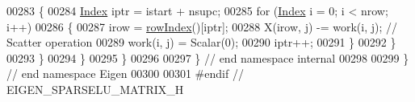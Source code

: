 \begin{DoxyCode}
00283         \{
00284           \hyperlink{namespace_eigen_a62e77e0933482dafde8fe197d9a2cfde}{Index} iptr = istart + nsupc; 
00285           \textcolor{keywordflow}{for} (\hyperlink{namespace_eigen_a62e77e0933482dafde8fe197d9a2cfde}{Index} i = 0; i < nrow; i++)
00286           \{
00287             irow = \hyperlink{group___sparse_l_u___module_a8e6b4f399aa468a10e58db627d43a12a}{rowIndex}()[iptr]; 
00288             X(irow, j) -= work(i, j); \textcolor{comment}{// Scatter operation}
00289             work(i, j) = Scalar(0); 
00290             iptr++;
00291           \}
00292         \}
00293       \}
00294     \} 
00295 \}
00296 
00297 \} \textcolor{comment}{// end namespace internal}
00298 
00299 \} \textcolor{comment}{// end namespace Eigen}
00300 
00301 \textcolor{preprocessor}{#endif // EIGEN\_SPARSELU\_MATRIX\_H}
\end{DoxyCode}
